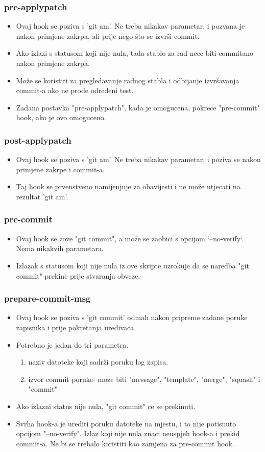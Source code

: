 \documentclass{beamer}
\begin{document}
\begin{frame}
\frametitle{pre-applypatch}
\begin{itemize}
    \item Ovaj hook se poziva s 'git am'. Ne treba nikakav parametar, i pozvana je  nakon primjene zakrpa, ali prije nego što se izvrši commit.
    \item Ako izlazi s statusom koji nije nula, tada stablo za rad nece biti commitano nakon primjene zakrpa.
    \item Može se koristiti za pregledavanje radnog stabla i odbijanje izvršavanja commit-a ako ne prode odredeni test.
    \item Zadana postavka "pre-applypatch", kada je omogucena, pokrece "pre-commit" hook, ako je ovo omoguceno.
\end{itemize}
\end{frame} 

\begin{frame}
\frametitle{post-applypatch}
\begin{itemize}
    \item Ovaj hook se poziva s 'git am'. Ne treba nikakav parametar, i poziva se nakon primjene zakrpe i commit-a.
    \item Taj hook se prvenstveno namijenjuje za obavijesti i ne može utjecati na rezultat 'git am'.
\end{itemize}
\end{frame}
	
\begin{frame}
\frametitle{pre-commit}
\begin{itemize}
    \item Ovaj hook se zove "git commit", a može se zaobici s opcijom `--no-verify`. Nema nikakvih parametara.
    \item Izlazak s statusom koji nije nula iz ove skripte uzrokuje da se naredba "git commit" prekine prije stvaranja obveze.
\end{itemize}
\end{frame}
	
\begin{frame}
\frametitle{prepare-commit-msg}
\begin{itemize}
    \item Ovaj hook se poziva s 'git commit' odmah nakon pripreme zadane poruke zapisnika i prije pokretanja uredivaca.
    \item Potrebno je jedan do tri parametra.
    \begin{enumerate}
        \item naziv datoteke koji sadrži poruku log zapisa.
        \item izvor commit poruke- moze biti "message", "template", "merge", "squash" i "commit"
    \end{enumerate}
    \item Ako izlazni status nije nula, "git commit" ce se prekinuti.
    \item Svrha hook-a je urediti poruku datoteke na mjestu, i to nije potisnuto opcijom "--no-verify". Izlaz koji nije nula znaci neuspjeh hook-a i prekid commit-a. Ne bi se trebalo koristiti kao zamjena za pre-commit hook.
\end{itemize}
\end{frame}
\end{document}
